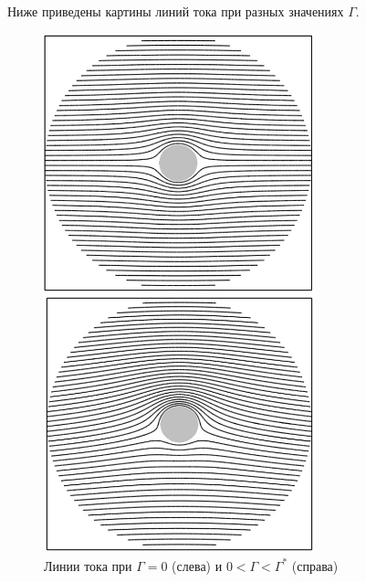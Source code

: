 
Ниже приведены картины линий тока при разных значениях $\Gamma$.
\begin{figure}[H]
    \centering
    \noindent
	\begin{minipage}{.5\textwidth}
	\centering
	  \includegraphics[width=0.7\textwidth]{photo/obtekaniecilindra1}
	\end{minipage}%
	\begin{minipage}{.5\textwidth}
	\centering
	  \includegraphics[width=0.7\textwidth]{photo/obtekaniecilindra2}
	\end{minipage}
    
    \caption{Линии тока при $\Gamma=0$ (слева) и $0<\Gamma<\Gamma^*$ (справа)}
    \label{fig:figure1}
\end{figure}
